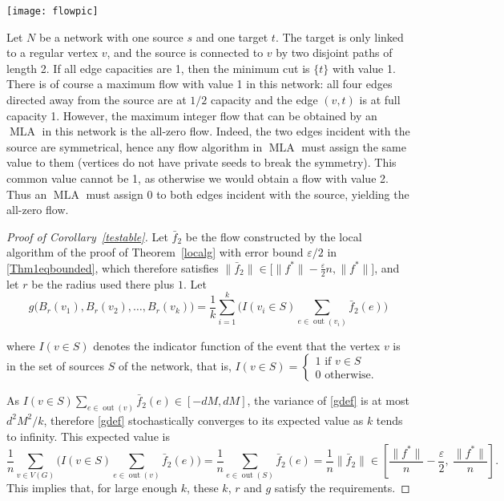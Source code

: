 \documentclass[12pt,a4paper]{article}
\newcommand{\out}{\operatorname{out}}
\newcommand{\eps}{\varepsilon}
\renewcommand{\:}{\colon}
\DeclareMathOperator{\MLA}{MLA}
\begin{document}
\begin{center}
\texttt{[image: flowpic]}
\end{center}

Let $N$ be a network with one source $s$ and one target $t$. 
The target is only linked to a regular vertex $v$, and the source is connected to $v$ by two disjoint paths of length 2. 
If all edge capacities are 1, then the minimum cut is $\{t\}$ with value 1. 
There is of course a maximum flow with value 1 in this network: all four edges directed away from the source are at $1/2$ capacity and the edge $(v,t)$ is at full capacity 1. 
However, the maximum integer flow that can be obtained by an $\MLA$ in this network is the all-zero flow. 
Indeed, the two edges incident with the source are symmetrical, hence any flow algorithm in $\MLA$ must assign the same value to them (vertices do not have private seeds to break the symmetry). 
This common value cannot be 1, as otherwise we would obtain a flow with value 2. 
Thus an $\MLA$ must assign 0 to both edges incident with the source, yielding the all-zero flow. 

\begin{proof}[Proof of Corollary~\ref{testable}]
Let $\bar{f}_2$ be the flow constructed by the local algorithm of the proof of Theorem~\ref{localg} with error bound $\eps/2$ in \eqref{Thm1eqbounded}, which therefore satisfies $\big\|\bar{f}_2\big\| \in \big[\big\|f^*\big\| - \frac{\eps}{2} n, \big\|f^*\big\|\big]$, and let $r$ be the radius used there plus $1$. 
Let 
\begin{equation} \label{gdef}
g\Big(B_r(v_1), B_r(v_2), \ldots, B_r(v_k)\Big) = \frac{1}{k} \sum_{i=1}^k \Big( I(v_i \in S) \sum_{e \in \out(v_i)} \bar{f}_2(e) \Big)
\end{equation}

where $I(v\in S)$ denotes the indicator function of the event that the vertex $v$ is in the set of sources $S$ of the network, that is, 
$I(v\in S) = 
\begin{cases}
1\text{ if } v\in S\\
0\text{ otherwise.}
\end{cases}$

As $I(v \in S) \sum_{e \in \out(v)} \bar{f}_2(e) \in [-dM, dM]$, the variance of \eqref{gdef} is at most $d^2M^2 / k$, therefore \eqref{gdef} stochastically converges to its expected value as $k$ tends to infinity. 
This expected value is
\begin{equation*}
\frac{1}{n} \sum_{v \in V(G)} \Big( I(v \in S) \sum_{e \in \out(v)} \bar{f}_2(e) \Big) = \frac{1}{n} \sum_{e \in \out(S)} \bar{f}_2(e) = \frac{1}{n} \big\|\bar{f}_2\big\| \in \left[\frac{\big\|f^*\big\|}{n} - \frac{\eps}{2},\ \frac{\big\|f^*\big\|}{n}\right].
\end{equation*}
This implies that, for large enough $k$, these $k$, $r$ and $g$ satisfy the requirements.
\end{proof}
\end{document}
